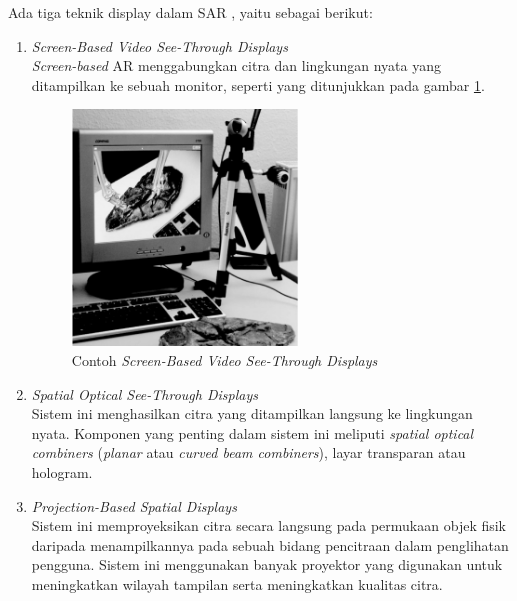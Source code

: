 Ada tiga teknik display dalam SAR \cite{Bimber2005}, yaitu sebagai berikut:
\begin{enumerate}
\item \textit{Screen-Based Video See-Through Displays}\\
\textit{Screen-based }AR menggabungkan citra dan lingkungan nyata yang ditampilkan ke sebuah monitor, seperti yang ditunjukkan pada gambar \ref{fig:SAR_screen}.

\begin{figure}[h]
	\centering
		\includegraphics[width=6cm]{images/screen_SAR}
	\caption{\label{fig:SAR_screen} Contoh \textit{Screen-Based Video See-Through Displays} }
\end{figure}

\item \textit{Spatial Optical See-Through Displays}\\
Sistem ini menghasilkan citra yang ditampilkan langsung ke lingkungan nyata. Komponen yang penting dalam sistem ini meliputi \textit{spatial optical combiners} (\textit{planar} atau \textit{curved beam combiners}), layar transparan atau hologram.

\item \textit{Projection-Based Spatial Displays}\\
Sistem ini memproyeksikan citra secara langsung pada permukaan objek fisik daripada menampilkannya pada sebuah bidang pencitraan dalam penglihatan pengguna. Sistem ini menggunakan banyak proyektor yang digunakan untuk meningkatkan wilayah tampilan serta meningkatkan kualitas citra.

\end{enumerate}

